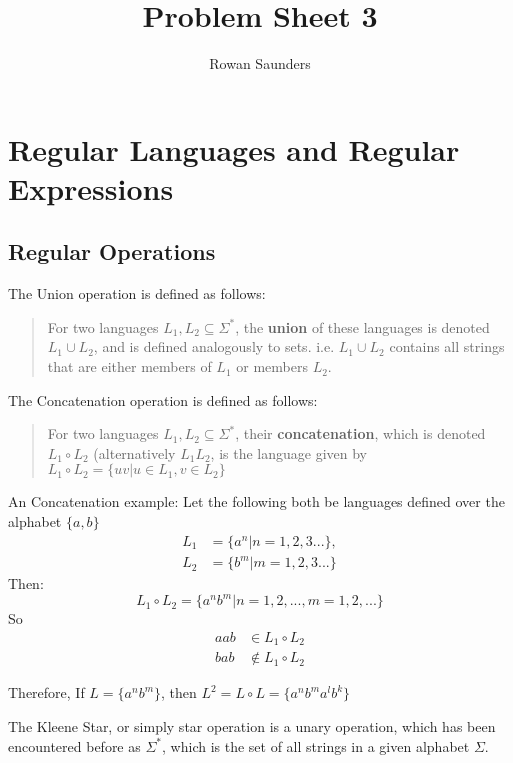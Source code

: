 \documentclass[11pt]{article}
\title{Problem Sheet 3}
\author{Rowan Saunders}
\begin{document}
\begin{titlepage}
	\maketitle
\end{titlepage}

\section{Regular Languages and Regular Expressions}
\subsection{Regular Operations}
The Union operation is defined as follows:

\begin{quote}
	For two languages $L_1, L_2 \subseteq \Sigma^\ast$, the \textbf{union} of
	these languages is denoted $L_1 \cup L_2$, and is defined analogously to sets.
	i.e. $L_1 \cup L_2$ contains all strings that are either members of $L_1$ or
	members $L_2$.
\end{quote}

The Concatenation operation is defined as follows:

\begin{quote}
	For two languages $L_1, L_2 \subseteq \Sigma^\ast$, their
	\textbf{concatenation}, which is denoted $L_1 \circ L_2$ (alternatively $L_1
		L_2$, is the language given by $L_1 \circ L_2 = \{uv | u \in L_1, v \in L_2 \}$
\end{quote}

An Concatenation example: Let the following both be languages defined over the alphabet $\{a, b\}$
\begin{align*}
	L_1 & = \{a^n | n = 1,2,3...\}, \\
	L_2 & = \{b^m | m = 1,2,3...\}
\end{align*}
Then:
$$ L_1 \circ L_2 = \{a^nb^m | n = 1,2,..., m=1,2,...\}$$
So
\begin{align*}
	aab & \in L_1 \circ L_2    \\
	bab & \notin L_1 \circ L_2
\end{align*}

Therefore, If $L=\{a^nb^m\}$, then $L^2 = L \circ L = \{a^nb^ma^lb^k\}$

The Kleene Star, or simply star operation is a unary operation, which has been
encountered before as $\Sigma^\ast$, which is the set of all strings in a given
alphabet $\Sigma$.
\end{document}
